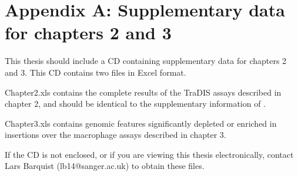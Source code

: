 \chapter{Appendix A: Supplementary data for chapters 2 and 3}
\ifpdf
    \graphicspath{{AppendixA/AppendixAFigs/EPS/}{AppendixA/AppendixAFigs/}}
\fi

This thesis should include a CD containing supplementary data for chapters 2 and 3. This CD contains two files in Excel format.

Chapter2.xls contains the complete results of the TraDIS assays described in chapter 2, and should be identical to the supplementary information of \textcite{Barquist2013a}.

Chapter3.xls contains genomic features significantly depleted or enriched in insertions over the macrophage assays described in chapter 3.

If the CD is not enclosed, or if you are viewing this thesis electronically, contact Lars Barquist (lb14@sanger.ac.uk) to obtain these files.


